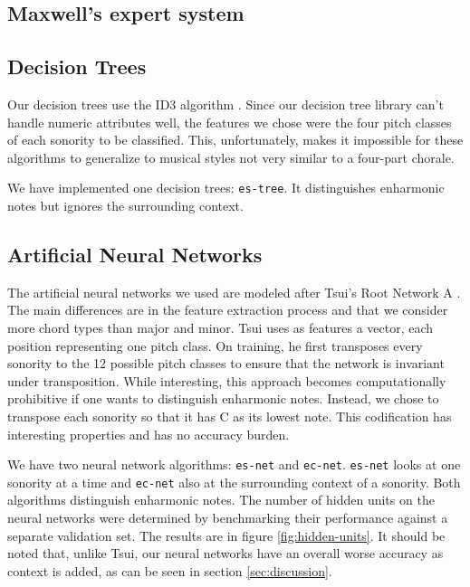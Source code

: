 \documentclass{article}
\begin{document}
\subsection{Maxwell's expert system}
\label{sec:maxwell}


\subsection{Decision Trees}
\label{sec:tree}

Our decision trees use the ID3 algorithm
\cite{mitchell:machine}. Since our decision tree library can't handle
numeric attributes well, the features we chose were the four pitch
classes of each sonority to be classified. This, unfortunately,
makes it impossible for these algorithms to generalize to musical
styles not very similar to a four-part chorale.

We have implemented one decision trees: \texttt{es-tree}. It
distinguishes enharmonic notes but ignores the surrounding context.

\subsection{Artificial Neural Networks}
\label{sec:neural-net}


The artificial neural networks we used are modeled after Tsui's Root
Network A \cite{tsui:harmonic}. The main differences are in the
feature extraction process and that we consider more chord types than
major and minor. Tsui uses as features a vector, each position
representing one pitch class. On training, he first transposes every
sonority to the 12 possible pitch classes to ensure that the network
is invariant under transposition. While interesting, this approach
becomes computationally prohibitive if one wants to distinguish
enharmonic notes. Instead, we chose to transpose each sonority so that
it has C as its lowest note. This codification has interesting
properties and has no accuracy burden.

We have two neural network algorithms: \texttt{es-net} and
\texttt{ec-net}.  \texttt{es-net} looks at one sonority at a time and
\texttt{ec-net} also at the surrounding context of a sonority. Both
algorithms distinguish enharmonic notes. The number of hidden units on
the neural networks were determined by benchmarking their performance
against a separate validation set. The results are in figure
\ref{fig:hidden-units}. It should be noted that, unlike Tsui, our
neural networks have an overall worse accuracy as context is added, as
can be seen in section \ref{sec:discussion}.
\end{document}

